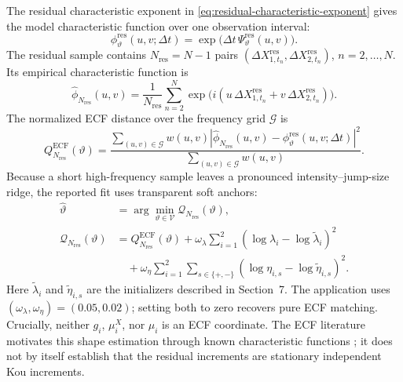 \documentclass[11pt]{article}
\begin{document}
The residual characteristic exponent in \eqref{eq:residual-characteristic-exponent} gives
the model characteristic function over one observation interval:
\begin{equation}\label{eq:model-cf}
\phi_\vartheta^{\mathrm{res}}(u,v;\Delta t)
=\exp\!\bigl(\Delta t\,\Psi_\vartheta^{\mathrm{res}}(u,v)\bigr).
\end{equation}
The residual sample contains $N_{\mathrm{res}}=N-1$ pairs
$(\Delta X_{1,t_n}^{\mathrm{res}},\Delta X_{2,t_n}^{\mathrm{res}})$, $n=2,\ldots,N$.
Its empirical characteristic function is
\begin{equation}\label{eq:ecf}
\widehat{\phi}_{N_{\mathrm{res}}}(u,v)
=\frac{1}{N_{\mathrm{res}}}\sum_{n=2}^{N}
\exp\!\bigl(i(u\,\Delta X_{1,t_n}^{\mathrm{res}}
+v\,\Delta X_{2,t_n}^{\mathrm{res}})\bigr).
\end{equation}
The normalized ECF distance over the frequency grid $\mathcal G$ is
\begin{equation}\label{eq:ecf-objective}
Q_{N_{\mathrm{res}}}^{\mathrm{ECF}}(\vartheta)
=\frac{\displaystyle\sum_{(u,v)\in\mathcal G}w(u,v)
\left|\widehat\phi_{N_{\mathrm{res}}}(u,v)
-\phi_\vartheta^{\mathrm{res}}(u,v;\Delta t)\right|^2}
{\displaystyle\sum_{(u,v)\in\mathcal G}w(u,v)}.
\end{equation}
Because a short high-frequency sample leaves a pronounced intensity--jump-size ridge, the
reported fit uses transparent soft anchors:
\begin{equation}\label{eq:ecf-penalized-objective}
\begin{aligned}
\widehat\vartheta
&=\arg\min_{\vartheta\in\mathcal V}\mathcal Q_{N_{\mathrm{res}}}(\vartheta),\\
\mathcal Q_{N_{\mathrm{res}}}(\vartheta)
&=Q_{N_{\mathrm{res}}}^{\mathrm{ECF}}(\vartheta)
+\omega_\lambda\sum_{i=1}^{2}(\log\lambda_i-\log\widetilde\lambda_i)^2\\
&\quad+\omega_\eta\sum_{i=1}^{2}\sum_{s\in\{+,-\}}
(\log\eta_{i,s}-\log\widetilde\eta_{i,s})^2.
\end{aligned}
\end{equation}
Here $\widetilde\lambda_i$ and $\widetilde\eta_{i,s}$ are the initializers described in
Section~7. The application uses $(\omega_\lambda,\omega_\eta)=(0.05,0.02)$; setting both to
zero recovers pure ECF matching. Crucially, neither $g_i$, $\mu_i^X$, nor $\mu_i$ is an ECF
coordinate. The ECF literature motivates this shape estimation through known characteristic
functions \citep{FeuervergerMcDunnough1981,Singleton2001,JiangKnight2002}; it does not by
itself establish that the residual increments are stationary independent Kou increments.
\end{document}
